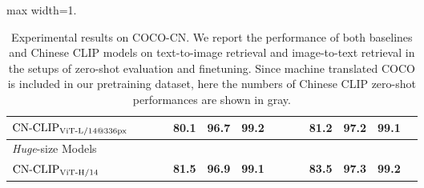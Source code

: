 \begin{table}[t]
\begin{adjustbox}{max width=1.\textwidth}
\begin{tabular}{@{\extracolsep{\fill}}lccccccccccccc}
    $\text{CN-CLIP}\rm_{ViT\text{-}L/14@336px}$
    & \color{gray}{64.7}	& \color{gray}{89.6}	& \color{gray}{94.6}	& \textbf{80.1}	& \textbf{96.7}	& \textbf{99.2} & \color{gray}{63.4}	& \color{gray}{87.2}	& \color{gray}{94.4}	& \textbf{81.2}	& \textbf{97.2}	& 99.1
    \\
\midrule
    \multicolumn{9}{l}{\textit{Huge}-size Models} \\
    $\text{CN-CLIP}\rm_{ViT\text{-}H/14}$
    & \color{gray}{69.2}	& \color{gray}{89.9}	& \color{gray}{96.1}	& \textbf{81.5}	& \textbf{96.9}	& \textbf{99.1}	& \color{gray}{63.0}	& \color{gray}{86.6}	& \color{gray}{92.9}	& \textbf{83.5}	& \textbf{97.3}	& \textbf{99.2}
    \\    
\bottomrule
\end{tabular}
\end{adjustbox}
\caption{Experimental results on COCO-CN. We report the performance of both baselines and Chinese CLIP models on text-to-image retrieval and image-to-text retrieval in the setups of zero-shot evaluation and finetuning. Since machine translated COCO is included in our pretraining dataset, here the numbers of Chinese CLIP zero-shot performances are shown in gray.}
\label{tb:coco}
\end{table}